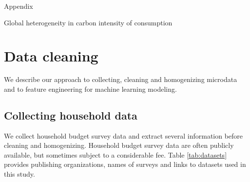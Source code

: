 \documentclass[12pt, a4paper]{article}
\begin{document}

\clearpage

\begin{refcontext}[sorting=nyt]
\printbibliography
\end{refcontext}

\clearpage

\appendix 
{\Huge Appendix} \label{sec:appendix}

Global heterogeneity in carbon intensity of consumption

\clearpage
\section{Data cleaning} \label{sec:cleaning}

We describe our approach to collecting, cleaning and homogenizing microdata and to feature engineering for machine learning modeling.

\subsection{Collecting household data}

We collect household budget survey data and extract several information before cleaning and homogenizing. Household budget survey data are often publicly available, but sometimes subject to a considerable fee. Table \ref{tab:datasets} provides publishing organizations, names of surveys and links to datasets used in this study.
\end{document}
